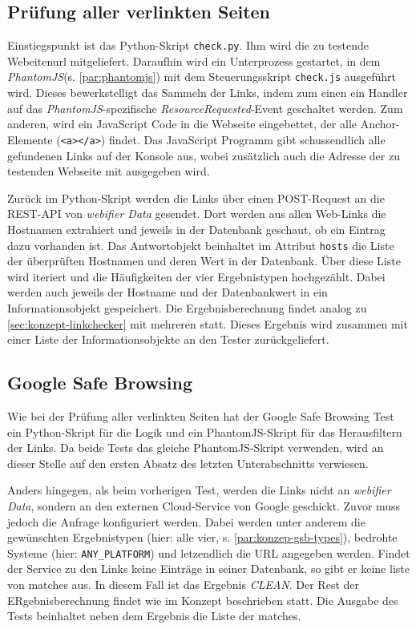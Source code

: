 \subsection{Prüfung aller verlinkten Seiten}

Einstiegspunkt ist das Python-Skript \lstinline{check.py}.
Ihm wird die zu testende Webeitenurl mitgeliefert.
Daraufhin wird ein Unterprozess gestartet, in dem \textit{PhantomJS}(s. \autoref{par:phantomjs}) mit dem Steuerungsskript \lstinline{check.js} ausgeführt wird.
Dieses bewerkstelligt das Sammeln der Links, indem zum einen ein Handler auf das \textit{PhantomJS}-spezifische \textit{ResourceRequested}-Event geschaltet werden.
Zum anderen, wird ein JavaScript Code in die Webseite eingebettet, der alle Anchor-Elemente (\lstinline{<a></a>}) findet.
Das JavaScript Programm gibt schussendlich alle gefundenen Links auf der Konsole aus, wobei zusätzlich auch die Adresse der zu testenden Webseite mit ausgegeben wird.

Zurück im Python-Skript werden die Links über einen POST-Request an die \ac{REST}-\ac{API} von \textit{webifier Data} gesendet.
Dort werden aus allen Web-Links die Hostnamen extrahiert und jeweils in der Datenbank geschaut, ob ein Eintrag dazu vorhanden ist.
Das Antwortobjekt beinhaltet im Attribut \lstinline[style=eclipse]{hosts} die Liste der überprüften Hostnamen und deren Wert in der Datenbank.
Über diese Liste wird iteriert und die Häufigkeiten der vier Ergebnistypen hochgezählt.
Dabei werden auch jeweils der Hostname und der Datenbankwert in ein Informationsobjekt gespeichert.
Die Ergebnisberechnung findet analog zu \autoref{sec:konzept-linkchecker} mit mehreren statt.
Dieses Ergebnis wird zusammen mit einer Liste der Informationsobjekte an den Tester zurückgeliefert.

\subsection{Google Safe Browsing}

Wie bei der Prüfung aller verlinkten Seiten hat der Google Safe Browsing Test ein Python-Skript für die Logik und ein PhantomJS-Skript für das Herausfiltern der Links.
Da beide Tests das gleiche PhantomJS-Skript verwenden, wird an dieser Stelle auf den ersten Absatz des letzten Unterabschnitts verwiesen.

Anders hingegen, als beim vorherigen Test, werden die Links nicht an \textit{webifier Data}, sondern an den externen Cloud-Service von Google geschickt.
Zuvor muss jedoch die Anfrage konfiguriert werden.
Dabei werden unter anderem die gewünschten Ergebnistypen (hier: alle vier, s. \autoref{par:konzep-gsb-types}), bedrohte Systeme (hier: \lstinline{ANY_PLATFORM}) und letzendlich die \acs{URL} angegeben werden.
Findet der Service zu den Links keine Einträge in seiner Datenbank, so gibt er keine liste von matches aus.
In diesem Fall ist das Ergebnis \textit{CLEAN}.
Der Rest der ERgebnisberechnung findet wie im Konzept beschrieben statt.
Die Ausgabe des Tests beinhaltet neben dem Ergebnis die Liste der matches.

